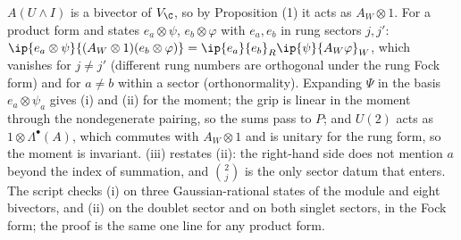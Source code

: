 $A(U \wedge I)$ is a bivector of $V_{\C}$, so by Proposition (1) it acts as $A_{W} \otimes 1$. For a product form and states $e_{a} \otimes \psi$, $e_{b} \otimes \varphi$ with $e_{a}, e_{b}$ in rung sectors $j, j'$: $\ip{e_{a} \otimes \psi}{(A_{W} \otimes 1)(e_{b} \otimes \varphi)} = \ip{e_{a}}{e_{b}}_{R}\ip{\psi}{A_{W}\varphi}_{W}$, which vanishes for $j \ne j'$ (different rung numbers are orthogonal under the rung Fock form) and for $a \ne b$ within a sector (orthonormality). Expanding $\Psi$ in the basis $e_{a} \otimes \psi_{a}$ gives (i) and (ii) for the moment; the grip is linear in the moment through the nondegenerate pairing, so the sums pass to $P$; and $U(2)$ acts as $1 \otimes \Lambda^{\bullet}(A)$, which commutes with $A_{W} \otimes 1$ and is unitary for the rung form, so the moment is invariant. (iii) restates (ii): the right-hand side does not mention $a$ beyond the index of summation, and $\binom{2}{j}$ is the only sector datum that enters. The script checks (i) on three Gaussian-rational states of the module and eight bivectors, and (ii) on the doublet sector and on both singlet sectors, in the Fock form; the proof is the same one line for any product form.
